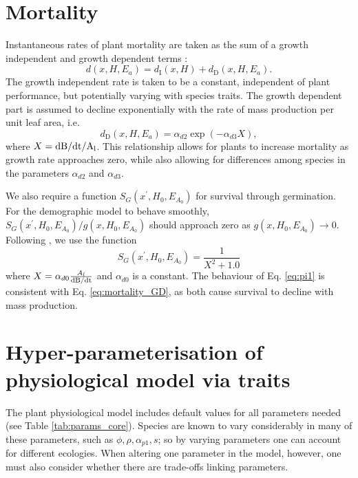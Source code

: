 \documentclass[10pt,twoside]{article}
\begin{document}
\section{Mortality}\label{mortality}

Instantaneous rates of plant mortality are taken as the sum of a growth
independent and growth dependent terms
\citep{Falster-2011, Moorcroft-2001}:
\begin{equation}\label{eq:mortality}
d(x, H, E_a) = d_{\textrm{I}}(x, H) + d_{\textrm{D}}(x, H, E_a).
\end{equation}
The growth independent rate is taken to be a constant, independent of
plant performance, but potentially varying with species traits. The
growth dependent part is assumed to decline exponentially with the rate
of mass production per unit leaf area, i.e.
\begin{equation}\label{eq:mortality_GD}
d_{\textrm{D}}(x, H, E_a) = \alpha_{d2}  \exp(-\alpha_{d3} X),
\end{equation}
where \(X = \rm{d}B / \rm{d}t / A_\textrm{l}\). This
relationship allows for plants to increase mortality as growth rate
approaches zero, while also allowing for differences among species in
the parameters \(\alpha_{d2}\) and \(\alpha_{d3}\).

We also require a function \(S_G(x^\prime, H_0, E_{A_0})\) for survival
through germination. For the demographic model to behave smoothly,
\(S_G (x^\prime, H_0, E_{A_0}) / g(x, H_0, E_{A_0})\) should approach zero as
\(g(x, H_0, E_{A_0}) \rightarrow 0\). Following \citep{Falster-2011},
we use the function
\begin{equation} \label{eq:pi1}
  S_G (x^\prime, H_0, E_{A_0}) = \frac1{X^2 + 1.0}
\end{equation}
where $X = \alpha_{d0} \frac{A_l}{\rm{d}B / \rm{d}t}$ and $\alpha_{d0}$ is a
constant. The behaviour of Eq. \ref{eq:pi1} is consistent with Eq.
\ref{eq:mortality_GD}, as both cause survival to decline with mass production.

\section{Hyper-parameterisation of physiological model via
traits}\label{traits}

The plant physiological model includes default values for all parameters needed
(see Table \ref{tab:params_core}). Species are known to vary considerably
in many of these parameters, such as $\phi,\rho, \alpha_{p1}, s$; so by varying  parameters
one can account for different ecologies. When altering one parameter in the model, however,
one must also consider whether there are trade-offs linking parameters.
\end{document}
